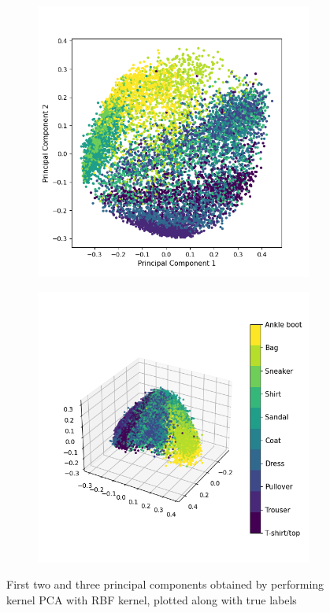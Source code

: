 \documentclass[12pt]{article}
\begin{document}
\begin{figure}[h]
	\begin{subfigure}{0.5\textwidth}
		\includegraphics[width=0.4\textheight]{pca_rbf_2comps.png}
		\caption{}
		\label{subfig:pca_rbf_2comps}
	\end{subfigure}
	\begin{subfigure}{0.5\textwidth}
		\includegraphics[width=0.4\textheight]{pca_rbf_3comps.png}
		\caption{}
		\label{subfig:pca_rbf_3comps}
	\end{subfigure}
	\caption{First two and three principal components obtained by performing kernel PCA with RBF kernel, plotted along with true labels}
	\label{fig:pca_rbf}
\end{figure}
\end{document}
